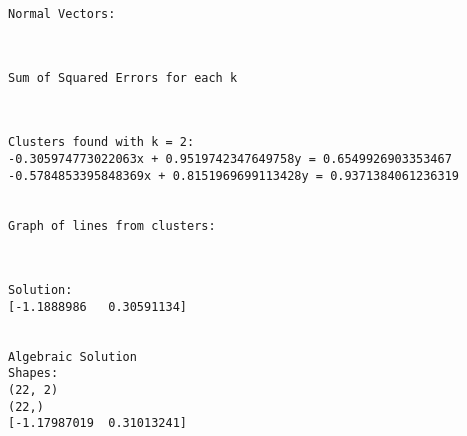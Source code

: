 \documentclass[11pt]{article}
\begin{document}
    \begin{center}
    \end{center}
    { \hspace*{\fill} \\}
    
    \begin{Verbatim}[commandchars=\\\{\}]


Normal Vectors:

    \end{Verbatim}

    \begin{center}
    \end{center}
    { \hspace*{\fill} \\}
    
    \begin{Verbatim}[commandchars=\\\{\}]
Sum of Squared Errors for each k

    \end{Verbatim}

    \begin{center}
    \end{center}
    { \hspace*{\fill} \\}
    
    \begin{Verbatim}[commandchars=\\\{\}]
Clusters found with k = 2:
-0.305974773022063x + 0.9519742347649758y = 0.6549926903353467
-0.5784853395848369x + 0.8151969699113428y = 0.9371384061236319


Graph of lines from clusters:

    \end{Verbatim}

    \begin{center}
    \end{center}
    { \hspace*{\fill} \\}
    
    \begin{Verbatim}[commandchars=\\\{\}]
Solution:
[-1.1888986   0.30591134]


Algebraic Solution
Shapes:
(22, 2)
(22,)
[-1.17987019  0.31013241]

    \end{Verbatim}
\end{document}
